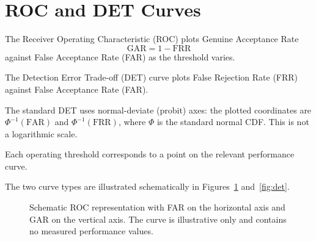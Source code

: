 \documentclass[11pt,a4paper,oneside]{report}
\newif\ifTikZAvailable
\begin{document}
\section{ROC and DET Curves}
\label{subsec:roc-det}

\begin{metricbox}[ -- ROC]
The Receiver Operating Characteristic (ROC) plots Genuine Acceptance Rate
\[
\mathrm{GAR}=1-\mathrm{FRR}
\]
\nopagebreak
against False Acceptance Rate (FAR) as the threshold varies.
\end{metricbox}

\begin{metricbox}[ -- DET]
The Detection Error Trade-off (DET) curve plots False Rejection Rate
(FRR) against False Acceptance Rate (FAR).

The standard DET uses normal-deviate (probit) axes:
the plotted coordinates are \(\Phi^{-1}(\mathrm{FAR})\) and
\(\Phi^{-1}(\mathrm{FRR})\), where \(\Phi\) is the standard normal CDF.
This is not a logarithmic scale.
\end{metricbox}

Each operating threshold corresponds to a point on the relevant
performance curve.

The two curve types are illustrated schematically in
Figures~\ref{fig:roc} and~\ref{fig:det}.

\begin{figure}[htbp]
\centering

\ifTikZAvailable

\begin{tikzpicture}[x=9.4cm,y=6.4cm]
%
    \draw[
        ->,
        line width=0.75pt
    ]
    (0,0)
    --
    (1.08,0)
    node[right]{
        \small FAR
    };
%
    \draw[
        ->,
        line width=0.75pt
    ]
    (0,0)
    --
    (0,1.08)
    node[above]{
        \small GAR
    };
%
    \draw[
        dashed,
        MidGray!70
    ]
    (0,0)
    --
    (1,1);
%
    \draw[
        SapienzaRed,
        line width=1.1pt,
        smooth
    ]
    plot coordinates {
        (0.00,0.00)
        (0.04,0.32)
        (0.10,0.54)
        (0.20,0.72)
        (0.35,0.84)
        (0.55,0.92)
        (0.75,0.97)
        (1.00,1.00)
    };
%
    \node[
        MidGray
    ]
    at (0.72,0.52) {
        \scriptsize reference diagonal
    };
%
\end{tikzpicture}

\else


\fi

\caption{
Schematic ROC representation with FAR on the horizontal axis
and GAR on the vertical axis.
The curve is illustrative only and contains no measured performance values.
}
\label{fig:roc}

\end{figure}
\end{document}
